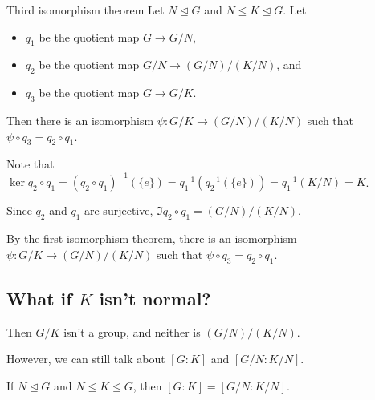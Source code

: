 \documentclass[12pt,letterpaper]{report}
\begin{document}
\begin{thm}{Third isomorphism theorem}{}
  Let $N \trianglelefteq G$ and $N \leq K \trianglelefteq G$.
  Let
  \begin{itemize}
    \item $q_1$ be the quotient map $G \to G/N$,
    \item $q_2$ be the quotient map $G/N \to (G/N)/(K/N)$, and
    \item $q_3$ be the quotient map $G \to G/K$.
  \end{itemize}
  Then there is an isomorphism $\psi \colon G/K \to (G/N)/(K/N)$ such that
  $\psi \circ q_3 = q_2 \circ q_1$.
\end{thm}

\begin{center}
\end{center}

\begin{thmproof}
  Note that $\ker q_2 \circ q_1 = (q_2 \circ q_1)^{-1}(\{e\}) = q_1^{-1}(q_2^{-1}(\{e\}))
    = q_1^{-1}(K/N) = K$.

  Since $q_2$ and $q_1$ are surjective, $\Im q_2 \circ q_1 = (G/N)/(K/N)$.

  By the first isomorphism theorem, there is an isomorphism $\psi \colon G/K \to (G/N)/(K/N)$ such
  that $\psi \circ q_3 = q_2 \circ q_1$.
\end{thmproof}

\pagebreak
\subsection[What if K isn't normal?]{What if $K$ isn't normal?}

Then $G/K$ isn't a group, and neither is $(G/N)/(K/N)$.

However, we can still talk about $[G : K]$ and $[G/N : K/N]$.

\begin{prop}{}{}
  If $N \trianglelefteq G$ and $N \leq K \leq G$, then $[G : K] = [G/N : K/N]$.
\end{prop}
\end{document}

